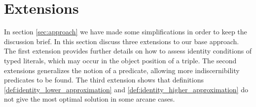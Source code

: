 \section{Extensions}
\label{sec:extensions}

In section \ref{sec:approach} 
  we have made some simplifications in order to keep the discussion brief.
In this section discuss three extensions to our base approach.
The first extension provides further details on how to assess
  identity conditions of typed literals, which may occur in the object
  position of a triple.
The second extensions generalizes the notion of a
predicate, allowing more indiscernibility predicates to be found.
The third extension shows that definitions
  \ref{def:identity_lower_approximation} and
  \ref{def:identity_higher_approximation}
  do not give the most optimal solution in some arcane cases.





